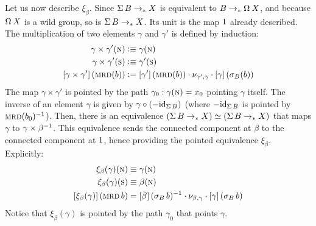 \documentclass[english,a4paper]{lmcs}
\begin{document}
Let us now describe $\xi_\beta$. Since $\operatorname{\Sigma} B \to_\ast X$ is equivalent to $B \ptdto \loopspace\null X$, and because $\loopspace\null X$ is a wild group, so is $\operatorname{\Sigma} B \to_\ast X$. Its unit is the map $1$ already described. The multiplication of two elements $\gamma$ and $\gamma'$ is defined by induction:
\begin{equation}
  \begin{aligned}
    \gamma \times \gamma' (\textsc{n}) &\vcentcolon\equiv \gamma(\textsc{n}) \\
    \gamma \times \gamma' (\textsc{s}) &\vcentcolon\equiv \gamma'(\textsc{s}) \\
    \left[{\gamma \times \gamma'}\right] (\operatorname{\textsc{mrd}} (b) ) &\vcentcolon=
    \left[{\gamma'}\right](\operatorname{\textsc{mrd}}(b)) \cdot \nu_{\gamma',\gamma} \cdot \left[{\gamma}\right](\sigma_B(b))
  \end{aligned}
  \label{eq:wild-group-from-susp-product}
\end{equation}
The map $\gamma \times \gamma'$ is pointed by the path $\gamma_0: \gamma(\textsc{n}) =
x_0$ pointing $\gamma$ itself.
The inverse of an element $\gamma$ is given by $\gamma \circ (-\mathord{\mathrm{id}}_{\operatorname{\Sigma} B})$
(where $-\mathord{\mathrm{id}}_{\operatorname{\Sigma} B}$ is pointed by $\operatorname{\textsc{mrd}}(b_0)^{-1}$).  Then, there is an
equivalence $(\operatorname{\Sigma} B \to_\ast X) \simeq (\operatorname{\Sigma} B \to_\ast X)$ that maps $\gamma$ to
$\gamma \times \beta^{-1}$. This equivalence sends the connected component at
$\beta$ to the connected component at $1$, hence providing the pointed
equivalence $\xi_\beta$. Explicitly:
\begin{align}
  \xi_\beta(\gamma)(\textsc{n}) &\equiv \gamma(\textsc{n}) \\
  \xi_\beta(\gamma)(\textsc{s}) &\equiv \beta(\textsc{n}) \\
  \left[{\xi_\beta(\gamma)}\right](\operatorname{\textsc{mrd}} b)
                          &= \left[{\beta}\right](\sigma_B\,b)^{-1} \cdot
                            \nu_{\beta,\gamma} \cdot
                            \left[{\gamma}\right](\sigma_B\,b)
\end{align}
Notice that $\xi_\beta(\gamma)$ is pointed by the path $\gamma_0$ that points
$\gamma$.
\end{document}
